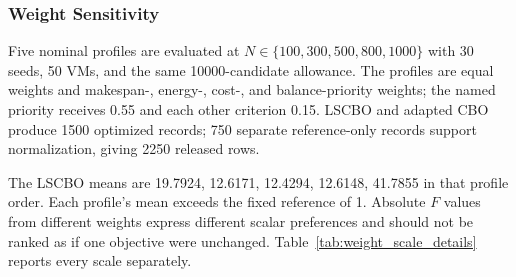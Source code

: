\FloatBarrier
\subsubsection{Weight Sensitivity}\label{sec:weight_sensitivity}
Five nominal profiles are evaluated at $N\in\{100,300,500,800,1000\}$ with 30 seeds, 50 VMs, and the same 10000-candidate allowance. The profiles are equal weights and makespan-, energy-, cost-, and balance-priority weights; the named priority receives 0.55 and each other criterion 0.15. LSCBO and adapted CBO produce 1500 optimized records; 750 separate reference-only records support normalization, giving 2250 released rows.

The LSCBO means are 19.7924, 12.6171, 12.4294, 12.6148, 41.7855 in that profile order. Each profile's mean exceeds the fixed reference of 1. Absolute $F$ values from different weights express different scalar preferences and should not be ranked as if one objective were unchanged. Table~\ref{tab:weight_scale_details} reports every scale separately.

